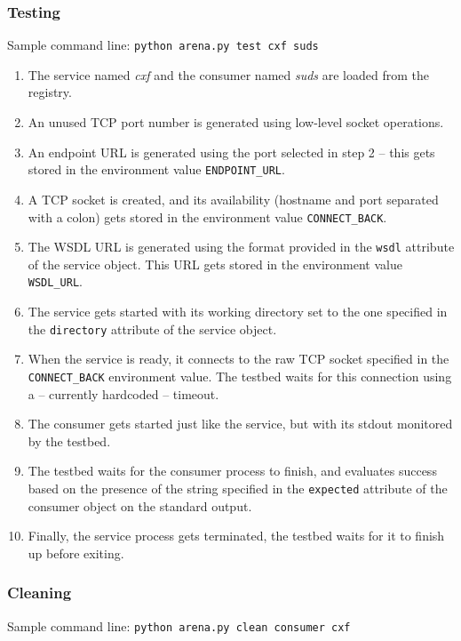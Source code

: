 \subsubsection{Testing}
\label{arena_test}

Sample command line: \verb|python arena.py test cxf suds|

\begin{enumerate}
 \item The service named \emph{cxf} and the consumer named \emph{suds} are loaded from the registry.
 \item An unused TCP port number is generated using low-level socket operations.
 \item An endpoint URL is generated using the port selected in step 2 -- this gets stored in the environment value \verb|ENDPOINT_URL|.
 \item A TCP socket is created, and its availability (hostname and port separated with a colon) gets stored in the environment value \verb|CONNECT_BACK|.
 \item The WSDL URL is generated using the format provided in the \verb|wsdl| attribute of the service object. This URL gets stored in the environment value \verb|WSDL_URL|.
 \item The service gets started with its working directory set to the one specified in the \verb|directory| attribute of the service object.
 \item When the service is ready, it connects to the raw TCP socket specified in the \verb|CONNECT_BACK| environment value. The testbed waits for this connection using a -- currently hardcoded -- timeout.
 \item The consumer gets started just like the service, but with its stdout monitored by the testbed.
 \item The testbed waits for the consumer process to finish, and evaluates success based on the presence of the string specified in the \verb|expected| attribute of the consumer object on the standard output.
 \item Finally, the service process gets terminated, the testbed waits for it to finish up before exiting.
\end{enumerate}

\subsubsection{Cleaning}

Sample command line: \verb|python arena.py clean consumer cxf|

